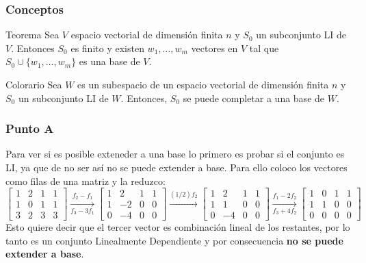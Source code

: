 \documentclass[a4paper,12pt]{article}
\begin{document}
\subsubsection{Conceptos}
\begin{teobox}{Teorema}
    Sea $V$ espacio vectorial de dimensión finita $n$ y $S_0$ un subconjunto LI de $V$. Entonces $S_0$  es finito  y existen $w_1,\ldots,w_m$ vectores en  $V$ tal que  $S_0 \cup \{w_1,\ldots,w_m\}$ es una base de $V$. 
\end{teobox}
\begin{teobox}{Colorario}
    Sea $W$ es un subespacio de un espacio vectorial de dimensión finita $n$ y $S_0$ un subconjunto LI de $W$. Entonces, $S_0$ se puede completar a una base de $W$. 
\end{teobox}
\subsubsection{Punto A}
Para ver si es posible exteneder a una base lo primero es probar si el conjunto es LI, ya que de no ser así no se puede extender a base. Para ello coloco los vectores como filas de una matriz y la reduzco:
$$
\begin{bmatrix}
1 & 2 & 1 & 1\\ 
1 & 0 & 1 & 1\\ 
3 & 2 & 3 & 3
\end{bmatrix}
\xrightarrow[f_3-3f_1]{f_2-f_1}
\begin{bmatrix}
1 & 2 & 1 & 1\\ 
1 & -2 & 0 & 0\\ 
0 & -4 & 0 & 0
\end{bmatrix}
\xrightarrow[]{(1/2)f_2}
\begin{bmatrix}
1 & 2 & 1 & 1\\ 
1 & 1 & 0 & 0\\ 
0 & -4 & 0 & 0
\end{bmatrix}
\xrightarrow[f_3+4f_2]{f_1-2f_2}
\begin{bmatrix}
1 & 0 & 1 & 1\\ 
1 & 1 & 0 & 0\\ 
0 & 0 & 0 & 0
\end{bmatrix}
$$
Esto quiere decir que el tercer vector es combinación lineal de los restantes, por lo tanto es un conjunto Linealmente Dependiente y por consecuencia \textbf{no se puede extender a base}.
\end{document}
